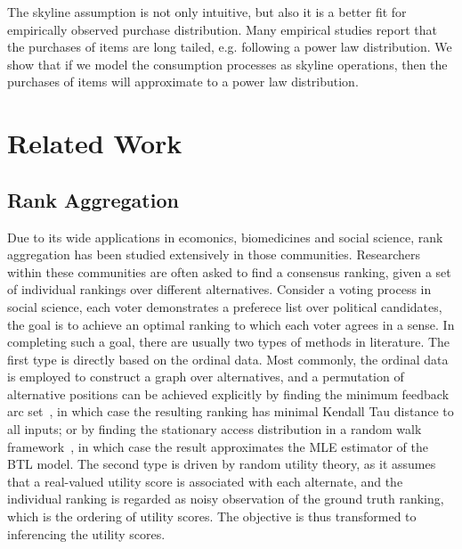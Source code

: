 \documentclass[sigconf]{acmart}
\begin{document}
The skyline assumption is not only intuitive, but also it is a better fit for empirically observed purchase distribution. Many empirical studies report that the purchases of items are long tailed, e.g. following a power law distribution. We show that if we model the consumption processes as skyline operations, then the purchases of items will approximate to a power law distribution. 

\section{Related Work}
\subsection{Rank Aggregation}
Due to its wide applications in ecomonics, biomedicines and social science, rank aggregation has been studied extensively in those communities. Researchers within these communities are often asked to find a consensus ranking, given a set of individual rankings over different alternatives. Consider a voting process in social science, each voter demonstrates a preferece list over political candidates, the goal is to achieve an optimal ranking to which each voter agrees in a sense.  In completing such a goal, there are usually two types of methods in literature. The first type is directly based on the ordinal data. Most commonly, the ordinal data is employed to construct a graph over alternatives, and a permutation of alternative positions can be achieved explicitly by finding the minimum feedback arc set~\cite{Alon2006Ranking}, in which case the resulting ranking has minimal Kendall Tau distance to all inputs; or by finding the stationary access distribution in a random walk framework~\cite{Negahban2012Iterative}, in which case the result approximates the MLE estimator of the BTL model. The second type is driven by random utility theory, as it assumes that a real-valued utility score is associated with each alternate, and the individual ranking is regarded as noisy observation of the ground truth ranking, which is the ordering of utility scores. The objective is thus transformed to inferencing the utility scores.         
\end{document}
